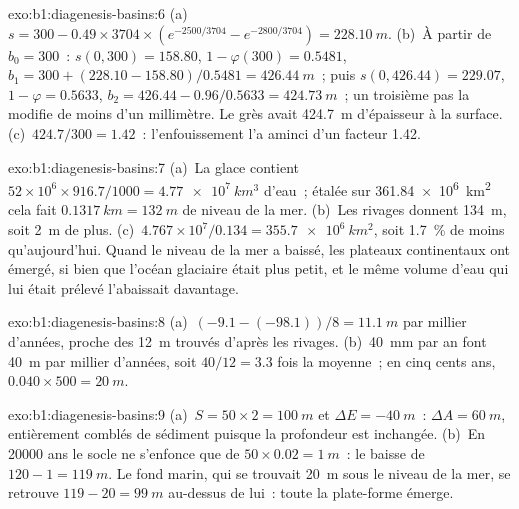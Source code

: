 \begin{solution}{exo:b1:diagenesis-basins:6}
(a)~$s = 300 - 0.49\times3704\times(e^{-2500/3704} - e^{-2800/3704}) =
\qty{228.10}{m}$. (b)~À partir de $b_0 = 300$~: $s(0, 300) = 158.80$, $1 - \varphi(300) =
0.5481$, $b_1 = 300 + (228.10 - 158.80)/0.5481 = \qty{426.44}{m}$~; puis
$s(0, 426.44) = 229.07$, $1 - \varphi = 0.5633$, $b_2 = 426.44 - 0.96/0.5633 =
\qty{424.73}{m}$~; un troisième pas la modifie de moins d'un millimètre. Le
grès avait \qty{424.7}{m} d'épaisseur à la surface. (c)~$424.7/300 = 1.42$~: l'enfouissement
l'a aminci d'un facteur \num{1.42}.
\end{solution}

\begin{solution}{exo:b1:diagenesis-basins:7}
(a)~La glace contient $52\times10^6\times916.7/1000 = \qty{4.77e7}{km^3}$ d'eau~;
étalée sur \qty{361.84e6}{km^2} cela fait $\qty{0.1317}{km} = \qty{132}{m}$ de niveau
de la mer. (b)~Les rivages donnent \qty{134}{m}, soit \qty{2}{m} de plus. (c)~$4.767\times
10^7/0.134 = \qty{355.7e6}{km^2}$, soit \qty{1.7}{\%} de moins qu'aujourd'hui. Quand le niveau de la mer
a baissé, les plateaux continentaux ont émergé, si bien que l'océan glaciaire était plus petit, et le
même volume d'eau qui lui était prélevé l'abaissait davantage.
\end{solution}

\begin{solution}{exo:b1:diagenesis-basins:8}
(a)~$(-9.1 - (-98.1))/8 = \qty{11.1}{m}$ par millier d'années, proche des
\qty{12}{m} trouvés d'après les rivages. (b)~\qty{40}{mm} par an font \qty{40}{m} par
millier d'années, soit $40/12 = 3.3$ fois la moyenne~; en cinq cents ans,
$0.040\times500 = \qty{20}{m}$.
\end{solution}

\begin{solution}{exo:b1:diagenesis-basins:9}
(a)~$S = 50\times2 = \qty{100}{m}$ et $\Delta E = \qty{-40}{m}$~:
$\Delta A = \qty{60}{m}$, entièrement comblés de sédiment puisque la profondeur est inchangée.
(b)~En \num{20000} ans le socle ne s'enfonce que de $50\times0.02 = \qty{1}{m}$~:
le  baisse de $120 - 1 = \qty{119}{m}$. Le fond marin, qui se trouvait
\qty{20}{m} sous le niveau de la mer, se retrouve $119 - 20 = \qty{99}{m}$ au-dessus de lui~: toute la
plate-forme émerge.
\end{solution}

